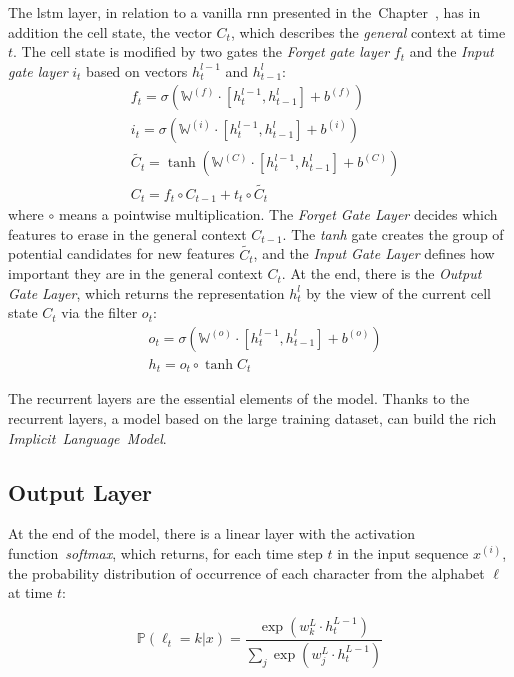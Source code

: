The \acrshort{lstm} layer, in relation to a vanilla \acrshort{rnn} presented in the~Chapter~,
has in addition the cell state, the vector $C_t$, which describes the \textit{general} context at time $t$.
The cell state is modified by two gates the \textit{Forget gate layer} $f_t$ and
the \textit{Input gate layer} $i_t$ based on vectors $h^{l-1}_t$ and $h^l_{t-1}$:
\begin{align}
&f_t = \sigma(\mathbb{W}^{(f)} \cdot [h^{l-1}_t, h^l_{t-1}] + b^{(f)}) \\
&i_t = \sigma(\mathbb{W}^{(i)} \cdot [h^{l-1}_t, h^l_{t-1}] + b^{(i)}) \\
&\tilde{C_t} = \tanh(\mathbb{W}^{(C)} \cdot [h^{l-1}_t, h^l_{t-1}] + b^{(C)}) \\ \label{eq:tanh}
&C_t = f_t \circ C_{t-1} + t_t \circ \tilde{C_t} \label{eq:lstm_state_update}
\end{align}
where $\circ$ means a pointwise multiplication.
The \textit{Forget Gate Layer} decides which features to erase in the general context $C_{t-1}$.
The \textit{tanh} gate creates the group of potential candidates for new features $\tilde{C_t}$, and
the \textit{Input Gate Layer} defines how important they are in the general context $C_t$.
At the end, there is the \textit{Output Gate Layer}, which returns the representation $h^l_t$
by the view of the current cell state $C_t$ via the filter $o_t$:
\begin{align}
&o_t = \sigma(\mathbb{W}^{(o)} \cdot [h^{l-1}_t, h^l_{t-1}] + b^{(o)}) \\
&h_t = o_t \circ \tanh{C_t}
\end{align}

The recurrent layers are the essential elements of the model.
Thanks to the recurrent layers, a model based on the large training dataset,
can build the rich \textit{Implicit~Language~Model}.

\subsection*{Output Layer}
At the end of the model, there is a linear layer with the activation function~\textit{softmax},
which returns, for each time step $t$ in the input sequence $x^{(i)}$,
the probability distribution of occurrence of each character from the alphabet $\ell$ at time $t$:

\begin{equation}
    \mathbb{P}(\ell_t = k | x) = \frac{\exp(w_k^L \cdot h_t^{L-1})}{\sum_{j}\exp(w_j^L \cdot h_t^{L-1})}
\end{equation}



